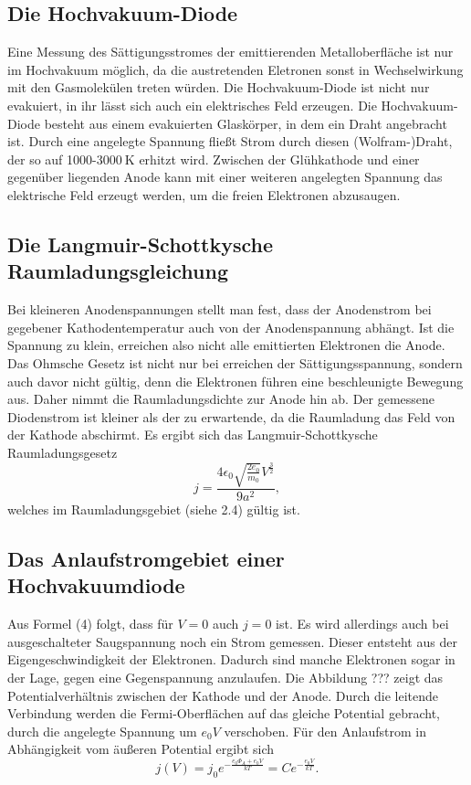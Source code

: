 \documentclass[11pt,ngerman,a4paper]{article}
\begin{document}
\subsection{Die Hochvakuum-Diode}
Eine Messung des Sättigungsstromes der emittierenden Metalloberfläche ist nur im Hochvakuum möglich, da die austretenden Eletronen sonst in Wechselwirkung mit den Gasmolekülen treten würden. Die Hochvakuum-Diode ist nicht nur evakuiert, in ihr lässt sich auch ein elektrisches Feld erzeugen.\newline
Die Hochvakuum-Diode besteht aus einem evakuierten Glaskörper, in dem ein Draht angebracht ist. Durch eine angelegte Spannung fließt Strom durch diesen (Wolfram-)Draht, der so auf 1000-$\SI{3000}{\kelvin}$ erhitzt wird. Zwischen der Glühkathode und einer gegenüber liegenden Anode kann mit einer weiteren angelegten Spannung das elektrische Feld erzeugt werden, um die freien Elektronen abzusaugen.
\subsection{Die Langmuir-Schottkysche Raumladungsgleichung}
Bei kleineren Anodenspannungen stellt man fest, dass der Anodenstrom bei gegebener Kathodentemperatur auch von der Anodenspannung abhängt. Ist die Spannung zu klein, erreichen also nicht alle emittierten Elektronen die Anode. Das Ohmsche Gesetz ist nicht nur bei erreichen der Sättigungsspannung, sondern auch davor nicht gültig, denn die Elektronen führen eine beschleunigte Bewegung aus. Daher nimmt die Raumladungsdichte zur Anode hin ab. Der gemessene Diodenstrom ist kleiner als der zu erwartende, da die Raumladung das Feld von der Kathode abschirmt. Es ergibt sich das Langmuir-Schottkysche Raumladungsgesetz
\begin{equation}
j = \frac{4 \epsilon_0 \sqrt{\frac{2 e_0}{m_0}} V^{\frac{3}{2}}}{9a^2},
\end{equation}
welches im Raumladungsgebiet (siehe 2.4) gültig ist.
\subsection{Das Anlaufstromgebiet einer Hochvakuumdiode}
Aus Formel (4) folgt, dass für $V=0$ auch $j=0$ ist. Es wird allerdings auch bei ausgeschalteter Saugspannung noch ein Strom gemessen. Dieser entsteht aus der Eigengeschwindigkeit der Elektronen. Dadurch sind manche Elektronen sogar in der Lage, gegen eine Gegenspannung anzulaufen. Die Abbildung ??? zeigt das Potentialverhältnis zwischen der Kathode und der Anode. Durch die leitende Verbindung werden die Fermi-Oberflächen auf das gleiche Potential gebracht, durch die angelegte Spannung um $e_0 V$ verschoben. Für den Anlaufstrom in Abhängigkeit vom äußeren Potential ergibt sich
\begin{equation}
j(V) = j_0 e^{-\frac{e_0 \Phi_A + e_0 V}{k T}} = C e^{-\frac{e_0 V}{k T}}.
\end{equation}
\end{document}
